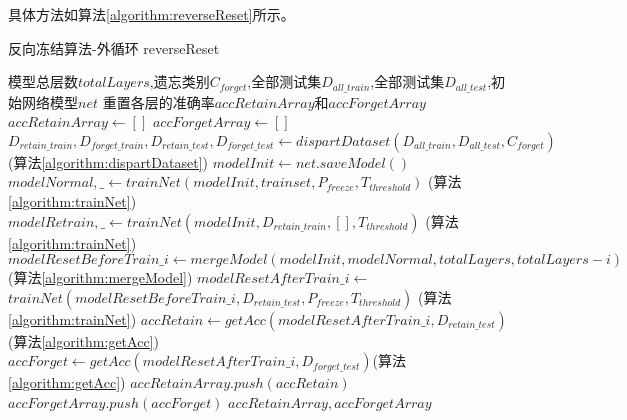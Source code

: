 具体方法如算法\ref{algorithm:reverseReset}所示。
\begin{algorithm}
	\renewcommand{\algorithmicrequire}{\textbf{Input:}}
	\renewcommand{\algorithmicensure}{\textbf{Output:}}
	\caption{反向冻结算法-外循环 reverseReset}
	\label{algorithm:reverseReset}
	\begin{algorithmic}[1]
        \REQUIRE 模型总层数$totalLayers$,遗忘类别$C_{forget}$,全部测试集$D_{all\_train}$,全部测试集$D_{all\_test}$,初始网络模型$net$
        \ENSURE  重置各层的准确率$accRetainArray$和$accForgetArray$
        \STATE $accRetainArray \gets []$
        \STATE $accForgetArray \gets []$
        \STATE $D_{retain\_train}, D_{forget\_train}, D_{retain\_test}, D_{forget\_test} \gets dispartDataset(D_{all\_train}, D_{all\_test}, C_{forget})$ (算法\ref{algorithm:dispartDataset})
        \STATE $modelInit \gets net.saveModel()$
        \STATE $modelNormal,\_ \gets trainNet(modelInit, trainset, P_{freeze}, T_{threshold})$ (算法\ref{algorithm:trainNet})
        \STATE $modelRetrain,\_ \gets trainNet(modelInit, D_{retain\_train}, [], T_{threshold})$ (算法\ref{algorithm:trainNet})
            \STATE $modelResetBeforeTrain\_i \gets mergeModel(modelInit, modelNormal, totalLayers, totalLayers - i)$  (算法\ref{algorithm:mergeModel})
            \STATE $modelResetAfterTrain\_i \gets$ $trainNet(modelResetBeforeTrain\_i , D_{retain\_test}, P_{freeze}, T_{threshold})$  (算法\ref{algorithm:trainNet})
            \STATE $accRetain \gets getAcc(modelResetAfterTrain\_i, D_{retain\_test})$ (算法\ref{algorithm:getAcc})
            \STATE $accForget \gets getAcc(modelResetAfterTrain\_i, D_{forget\_test})$(算法\ref{algorithm:getAcc})
            \STATE $accRetainArray.push(accRetain)$
            \STATE $accForgetArray.push(accForget)$
        \ENDFOR
        \RETURN $accRetainArray, accForgetArray$
	\end{algorithmic}  
\end{algorithm}

